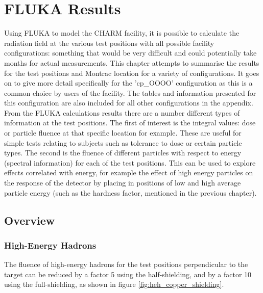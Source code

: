 %

\newpage
\section{FLUKA Results}

Using FLUKA to model the CHARM facility, it is possible to calculate the radiation field at the various test positions with all possible facility configurations: something that would be very difficult and could potentially take months for actual measurements. This chapter attempts to summarise the results for the test positions and Montrac location for a variety of configurations. It goes on to give more detail specifically for the 'cp\_OOOO' configuration as this is a common choice by users of the facility. The tables and information  presented for this configuration are also included for all other configurations in the appendix. \\

From the FLUKA calculations results there are a number different types of information at the test positions. The first of interest is the integral values: dose or particle fluence at that specific location for example. These are useful for simple tests relating to subjects such as tolerance to dose or certain particle types. The second is the fluence of different particles with respect to energy (spectral information) for each of the test positions. This can be used to explore effects correlated with energy, for example the effect of high energy particles on the response of the detector by placing in positions of low and high average particle energy (such as the hardness factor, mentioned in the previous chapter). \\

\subsection{Overview}

\subsubsection*{High-Energy Hadrons}

The fluence of high-energy hadrons for the test positions perpendicular to the target can be reduced by a factor 5 using the half-shielding, and by a factor 10 using the full-shielding, as shown in figure \ref{fig:heh_copper_shielding}. \\

